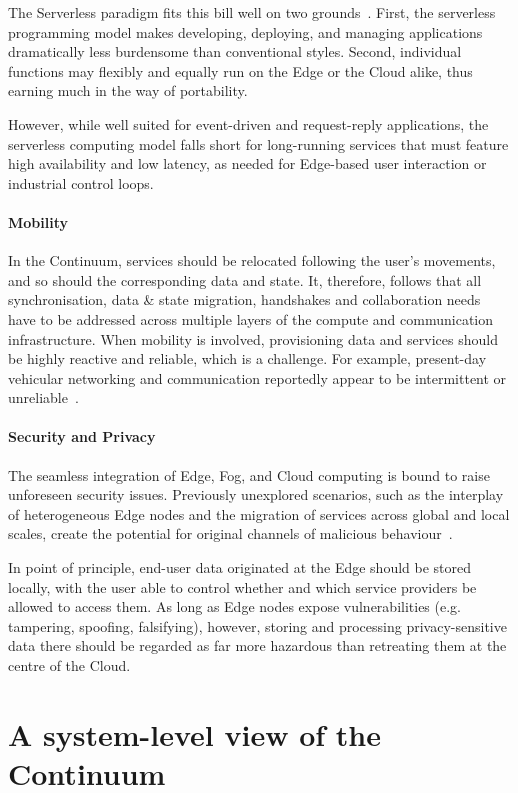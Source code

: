 The Serverless paradigm fits this bill well on two grounds~\cite{yi2017lavea}. First, the serverless programming model makes developing, deploying, and managing applications dramatically less burdensome than conventional styles.
Second, individual functions may flexibly and equally run on the Edge or the Cloud alike, thus earning much in the way of portability.

However, while well suited for event-driven and request-reply applications, the serverless computing model falls short for long-running services that must feature high availability and low latency, as needed for Edge-based user interaction or industrial control loops.

\paragraph{Mobility}
In the Continuum, services should be relocated following the user's movements, and so should the corresponding data and state. 
It, therefore, follows that all synchronisation, data \& state migration, handshakes and collaboration needs have to be addressed across multiple layers of the compute and communication infrastructure.
When mobility is involved, provisioning data and services should be highly reactive and reliable, which is a challenge. 
For example, present-day vehicular networking and communication reportedly appear to be intermittent or unreliable~\cite{he2014developing}.

\paragraph{Security and Privacy}

The seamless integration of Edge, Fog, and Cloud computing is bound to raise unforeseen security issues. Previously unexplored scenarios, such as the interplay of heterogeneous Edge nodes and the migration of services across global and local scales, create the potential for original channels of malicious behaviour~\cite{yu2017survey}.

In point of principle, end-user data originated at the Edge should be stored locally, with the user able to control whether and which service providers be allowed to access them. 
As long as Edge nodes expose vulnerabilities (e.g. tampering, spoofing, falsifying), however, storing and processing privacy-sensitive data there should be regarded as far more hazardous than retreating them at the centre of the Cloud.

\section{A system-level view of the Continuum}
\label{sec:technicals}

